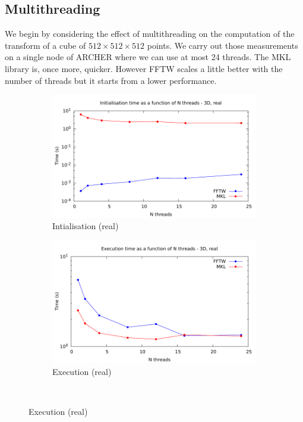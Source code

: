 \documentclass[12pt, a4paper]{article}
\begin{document}
\subsection{Multithreading}\label{MULTITHREADING}
We begin by considering the effect of multithreading on the computation of the transform of a cube of $512 \times 512 \times 512$ points. We carry out those measurements on a single node of ARCHER where we can use at most 24 threads. The MKL library is, once more, quicker. However FFTW scales a little better with the number of threads but it starts from  a lower performance.
\begin{figure}[H]
\captionsetup{width=0.8\linewidth}
\centering
\begin{subfigure}{.5\textwidth}
\centering
\includegraphics[width=.9\linewidth]{graphs/3d-multh-init-r.pdf}
\caption{Intialisation (real)}
\label{3DMULTHRI}
\end{subfigure}%
\begin{subfigure}{.5\textwidth}
\centering
\includegraphics[width=.9\linewidth]{graphs/3d-multh-exec-r.pdf}
\caption{Execution (real)}
\label{3DMULTHRE}
\end{subfigure}\\

\end{figure}
\end{document}

